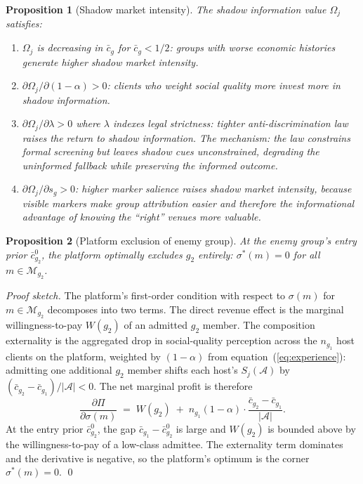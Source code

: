 \documentclass[12pt,a4paper]{article}
\newtheorem{proposition}{Proposition}
\theoremstyle{definition}
\numberwithin{proposition}{subsection}
\newcommand{\M}{\mathcal{M}}
\begin{document}
\begin{proposition}[Shadow market intensity]
\label{prop:shadow}
The shadow information value $\Omega_j$ satisfies:
\begin{enumerate}[noitemsep]
  \item $\Omega_j$ is decreasing in $\bar{c}_g$ for $\bar{c}_g < 1/2$:
  groups with worse economic histories generate higher shadow market
  intensity.
  \item $\partial \Omega_j / \partial (1-\alpha) > 0$: clients who
  weight social quality more invest more in shadow information.
  \item $\partial \Omega_j / \partial \lambda > 0$ where $\lambda$
  indexes legal strictness: tighter anti-discrimination law raises
  the return to shadow information. The mechanism: the law constrains
  formal screening but leaves shadow cues unconstrained, degrading
  the uninformed fallback while preserving the informed outcome.
  \item $\partial \Omega_j / \partial s_g > 0$: higher marker
  salience raises shadow market intensity, because visible markers
  make group attribution easier and therefore the informational
  advantage of knowing the ``right'' venues more valuable.
\end{enumerate}
\end{proposition}

\begin{proposition}[Platform exclusion of enemy group]
\label{prop:exclusion}
At the enemy group's entry prior $\bar{c}_{g_2}^0$, the platform
optimally excludes $g_2$ entirely:
$\sigma^*(m) = 0$ for all $m \in \M_{g_2}$.
\end{proposition}

\begin{proof}[Proof sketch]
The platform's first-order condition with respect to
$\sigma(m)$ for $m \in \M_{g_2}$ decomposes into two terms. The
direct revenue effect is the marginal willingness-to-pay $W(g_2)$ of
an admitted $g_2$ member. The composition externality is the
aggregated drop in social-quality perception across the $n_{g_1}$
host clients on the platform, weighted by $(1 - \alpha)$ from
equation~(\ref{eq:experience}): admitting one additional $g_2$
member shifts each host's $S_j(\mathcal{A})$ by
$(\bar{c}_{g_2} - \bar{c}_{g_1})/|\mathcal{A}| < 0$. The net
marginal profit is therefore
\[
  \frac{\partial \Pi}{\partial \sigma(m)} \;=\;
  W(g_2) \;+\; n_{g_1} (1 - \alpha)
  \cdot \frac{\bar{c}_{g_2} - \bar{c}_{g_1}}{|\mathcal{A}|}.
\]
At the entry prior $\bar{c}_{g_2}^0$, the gap
$\bar{c}_{g_1} - \bar{c}_{g_2}^0$ is large and $W(g_2)$ is bounded
above by the willingness-to-pay of a low-class admittee. The
externality term dominates and the derivative is negative, so the
platform's optimum is the corner $\sigma^*(m) = 0$.
\qed
\end{proof}
\end{document}
